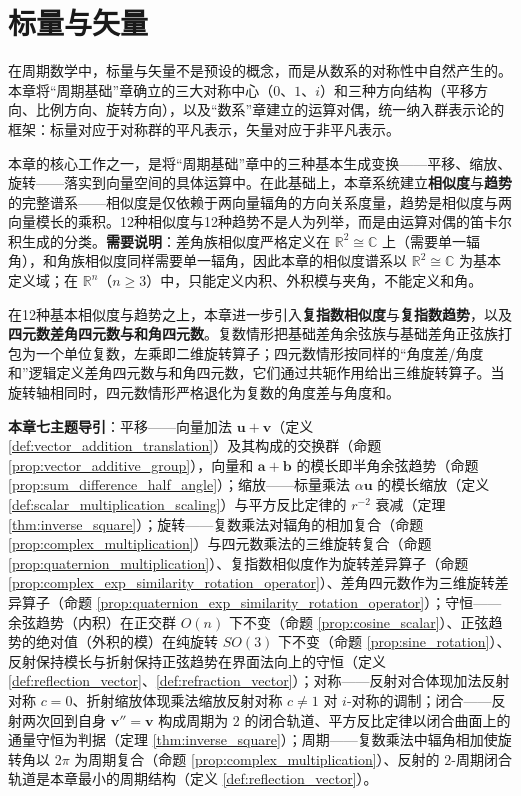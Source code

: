\chapter{标量与矢量}

\begin{remark}[本章定位]\label{rem:chapter_positioning_ch3}
在周期数学中，标量与矢量不是预设的概念，而是从数系的对称性中自然产生的。本章将“周期基础”章确立的三大对称中心（$0$、$1$、$i$）和三种方向结构（平移方向、比例方向、旋转方向），以及“数系”章建立的运算对偶，统一纳入群表示论的框架：标量对应于对称群的平凡表示，矢量对应于非平凡表示。

本章的核心工作之一，是将“周期基础”章中的三种基本生成变换——平移、缩放、旋转——落实到向量空间的具体运算中。在此基础上，本章系统建立\textbf{相似度}与\textbf{趋势}的完整谱系——相似度是仅依赖于两向量辐角的方向关系度量，趋势是相似度与两向量模长的乘积。12种相似度与12种趋势不是人为列举，而是由运算对偶的笛卡尔积生成的分类。\textbf{需要说明}：差角族相似度严格定义在 $\mathbb{R}^2\cong\mathbb{C}$ 上（需要单一辐角），和角族相似度同样需要单一辐角，因此本章的相似度谱系以 $\mathbb{R}^2\cong\mathbb{C}$ 为基本定义域；在 $\mathbb{R}^n$（$n\ge 3$）中，只能定义内积、外积模与夹角，不能定义和角。

在12种基本相似度与趋势之上，本章进一步引入\textbf{复指数相似度}与\textbf{复指数趋势}，以及\textbf{四元数差角四元数与和角四元数}。复数情形把基础差角余弦族与基础差角正弦族打包为一个单位复数，左乘即二维旋转算子；四元数情形按同样的“角度差/角度和”逻辑定义差角四元数与和角四元数，它们通过共轭作用给出三维旋转算子。当旋转轴相同时，四元数情形严格退化为复数的角度差与角度和。

\textbf{本章七主题导引}：平移——向量加法 $\mathbf{u}+\mathbf{v}$（定义 \ref{def:vector_addition_translation}）及其构成的交换群（命题 \ref{prop:vector_additive_group}），向量和 $\mathbf{a}+\mathbf{b}$ 的模长即半角余弦趋势（命题 \ref{prop:sum_difference_half_angle}）；缩放——标量乘法 $\alpha\mathbf{u}$ 的模长缩放（定义 \ref{def:scalar_multiplication_scaling}）与平方反比定律的 $r^{-2}$ 衰减（定理 \ref{thm:inverse_square}）；旋转——复数乘法对辐角的相加复合（命题 \ref{prop:complex_multiplication}）与四元数乘法的三维旋转复合（命题 \ref{prop:quaternion_multiplication}）、复指数相似度作为旋转差异算子（命题 \ref{prop:complex_exp_similarity_rotation_operator}）、差角四元数作为三维旋转差异算子（命题 \ref{prop:quaternion_exp_similarity_rotation_operator}）；守恒——余弦趋势（内积）在正交群 $O(n)$ 下不变（命题 \ref{prop:cosine_scalar}）、正弦趋势的绝对值（外积的模）在纯旋转 $SO(3)$ 下不变（命题 \ref{prop:sine_rotation}）、反射保持模长与折射保持正弦趋势在界面法向上的守恒（定义 \ref{def:reflection_vector}、\ref{def:refraction_vector}）；对称——反射对合体现加法反射对称 $c=0$、折射缩放体现乘法缩放反射对称 $c\neq 1$ 对 $i$-对称的调制；闭合——反射两次回到自身 $\mathbf{v}''=\mathbf{v}$ 构成周期为 $2$ 的闭合轨道、平方反比定律以闭合曲面上的通量守恒为判据（定理 \ref{thm:inverse_square}）；周期——复数乘法中辐角相加使旋转角以 $2\pi$ 为周期复合（命题 \ref{prop:complex_multiplication}）、反射的 $2$-周期闭合轨道是本章最小的周期结构（定义 \ref{def:reflection_vector}）。
\end{remark}

